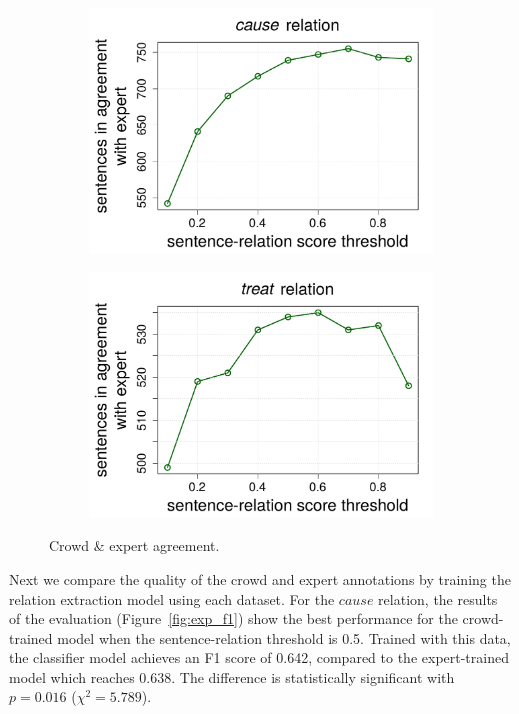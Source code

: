 \begin{figure}[htb!]
\centering
\begin{subfigure}{.5\textwidth}
\includegraphics[width=\linewidth]{img/cause_expert_agr.pdf}
\end{subfigure}%
\begin{subfigure}{.5\textwidth}
\includegraphics[width=\linewidth]{img/treats_expert_agr.pdf}
\end{subfigure}
\caption{Crowd \& expert agreement.}
\label{fig:crowd_exp_agr}
\end{figure}

Next we compare the quality of the crowd and expert annotations by training the relation extraction model using each dataset. For the $cause$ relation, the results of the evaluation (Figure~\ref{fig:exp_f1}) show the best performance for the crowd-trained model when the sentence-relation threshold is 0.5. Trained with this data, the classifier model achieves an F1 score of 0.642, compared to the expert-trained model which reaches 0.638. The difference is statistically significant with $p = 0.016$ ($\chi^2 = 5.789$).

